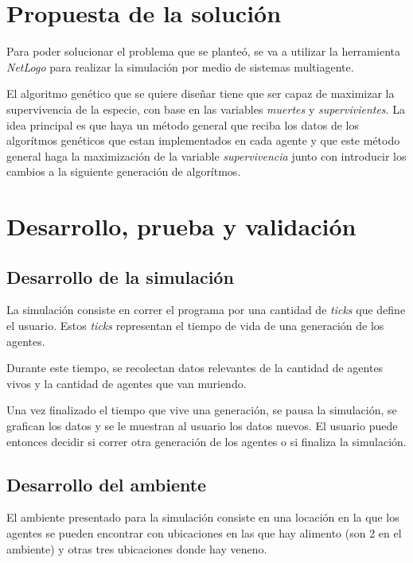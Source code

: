 \documentclass[times,10pt,twocolumn]{article}
\begin{document}
\section{Propuesta de la solución}

Para poder solucionar el problema que se planteó, se va a utilizar la herramienta \emph{NetLogo} para realizar la simulación por medio de sistemas multiagente.\par
El algoritmo genético que se quiere diseñar tiene que ser capaz de maximizar la supervivencia de la especie, con base en las variables \emph{muertes} y \emph{supervivientes}. La idea principal es que haya un método general que reciba los datos de los algorítmos genéticos que estan implementados en cada agente y que este método general haga la maximización de la variable \emph{supervivencia} junto con introducir los cambios a la siguiente generación de algorítmos.

\section{Desarrollo, prueba y validación}

\subsection{Desarrollo de la simulación}
La simulación consiste en correr el programa por una cantidad de \emph{ticks} que define el usuario. Estos \emph{ticks} representan el tiempo de vida de una generación de los agentes.\par
Durante este tiempo, se recolectan datos relevantes de la cantidad de agentes vivos y la cantidad de agentes que van muriendo.\par
Una vez finalizado el tiempo que vive una generación, se pausa la simulación, se grafican los datos y se le muestran al usuario los datos nuevos. El usuario puede entonces decidir si correr otra generación de los agentes o si finaliza la simulación.
\subsection{Desarrollo del ambiente}
El ambiente presentado para la simulación consiste en una locación en la que los agentes se pueden encontrar con ubicaciones en las que hay alimento (son 2 en el ambiente) y otras tres ubicaciones donde hay veneno.
\end{document}
